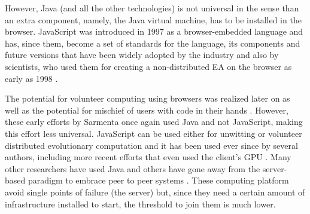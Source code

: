 \documentclass{sig-alternate}
\begin{document}
However, Java (and all the other technologies)
is not universal in the
sense than an extra component, namely, the Java virtual machine, has
to be installed in the browser. JavaScript
\cite{flanagan2006javascript} was introduced in 1997 as a
browser-embedded language and has, since them, become a set of standards
\cite{ECMA-262} for the language, its components and future versions
that have been widely adopted by the industry and also by scientists,
who used them for creating a non-distributed EA on
the browser as early as 1998 \cite{jj-ppsn98}. 

The potential for volunteer computing using browsers was realized
later on \cite{sarmenta-bayanihan} as well as the potential for
mischief of users with code in their hands
\cite{sarmenta-sabotagetolerance}. However, these early efforts by
Sarmenta once again used Java and not JavaScript, making this effort
less universal. JavaScript can be used either for unwitting
\cite{unwitting-ec} or volunteer
\cite{langdon:2005:metas,gecco07:workshop:dcor} distributed
evolutionary computation and it has been used ever since by several
authors, including more recent efforts \cite{Desell:2008:AHG:1389095.1389273,duda2013distributed,DBLP:journals/corr/abs-0801-1210} that even
used the client's GPU \cite{duda2013gpu}. Many other researchers have
used Java \cite{chong:1999:jDGPi} and others have gone away from the
server-based paradigm to embrace peer to peer systems
\cite{jin2006constructing,10.1109/ICICSE.2008.99}. These computing
platform avoid single points of failure (the server) but, since they
need a certain amount of infrastructure installed to start, the
threshold to join them is much lower. 
\end{document}
